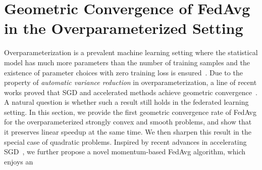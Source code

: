 


\section{Geometric Convergence of FedAvg in the Overparameterized Setting}
\label{sec:overparameterized}
Overparameterization is a prevalent machine learning setting where the
statistical model has much more parameters than the number of training samples
and the existence of parameter choices with zero training loss is
ensured~\cite{allen2018convergence,zhang2016understanding}.  Due to the
property of \textit{automatic variance reduction} in overparameterization,  a
line of recent works proved that SGD and accelerated methods achieve geometric
convergence~\cite{ma2017power,moulines2011non,needell2014stochastic,schmidt2013fast,strohmer2009randomized}.
A natural question is whether such a result still holds in the federated
learning setting. 
In this section, we provide the first geometric convergence rate
of FedAvg for the overparameterized strongly convex and smooth problems,
and show that it preserves linear speedup at the same time.  
We then sharpen this result in the special case of
quadratic problems.
Inspired by recent advances in accelerating SGD~\cite{liu2019accelerating,jain2017accelerating}, 
we further propose a novel momentum-based FedAvg algorithm, which enjoys an
